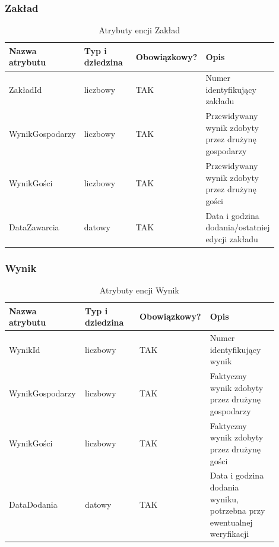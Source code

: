 \documentclass{mwrep}
\begin{document}
\newpage

\subsubsection{Zakład}
\begin{table}[H]
	\begin{tabular}{|p{0.25\linewidth}|p{0.2\linewidth}|p{0.2\linewidth}|p{0.25\linewidth}|}
	\hline
	Nazwa atrybutu & Typ i dziedzina & Obowiązkowy? & Opis                                                           \\ \hline
	ZakładId   & liczbowy                            & TAK                              & Numer identyfikujący zakładu                                                   \\ \hline
	WynikGospodarzy         & liczbowy                           & TAK                              & Przewidywany wynik zdobyty przez drużynę gospodarzy         \\ \hline
	WynikGości          & liczbowy                            & TAK                              & Przewidywany wynik zdobyty przez drużynę gości                        \\ \hline
	DataZawarcia           & datowy                            & TAK                              & Data i godzina dodania/ostatniej edycji zakładu                 \\ \hline
	\end{tabular}
	\caption{Atrybuty encji Zakład}
\end{table}

\vspace{1cm}

\subsubsection{Wynik}
\begin{table}[H]
	\begin{tabular}{|p{0.25\linewidth}|p{0.2\linewidth}|p{0.2\linewidth}|p{0.25\linewidth}|}
	\hline
	Nazwa atrybutu & Typ i dziedzina & Obowiązkowy? & Opis                                                           \\ \hline
	WynikId   & liczbowy                            & TAK                              & Numer identyfikujący wynik                                                   \\ \hline
	WynikGospodarzy         & liczbowy                            & TAK                              & Faktyczny wynik zdobyty przez drużynę gospodarzy         \\ \hline
	WynikGości          & liczbowy                            & TAK                              & Faktyczny wynik zdobyty przez drużynę gości                        \\ \hline
	DataDodania           & datowy                            & TAK                              & Data i godzina dodania wyniku, potrzebna przy ewentualnej weryfikacji    \\ \hline
	\end{tabular}
	\caption{Atrybuty encji Wynik}
\end{table}
\end{document}
